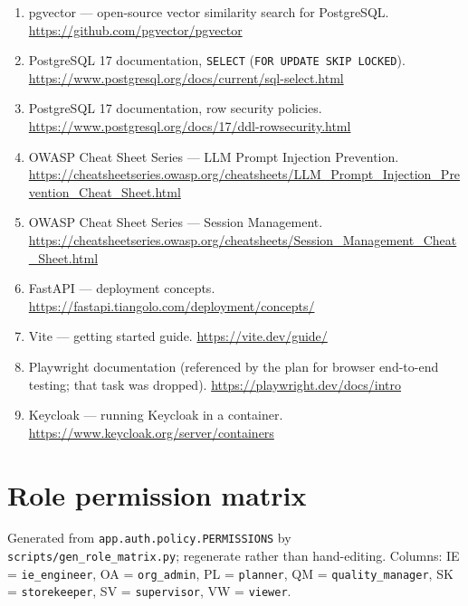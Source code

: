 \documentclass[11pt,a4paper]{article}
\begin{document}
\begin{enumerate}[leftmargin=2em]
\item pgvector --- open-source vector similarity search for PostgreSQL.
  \url{https://github.com/pgvector/pgvector}
\item PostgreSQL 17 documentation, \texttt{SELECT} (\texttt{FOR UPDATE SKIP
  LOCKED}). \url{https://www.postgresql.org/docs/current/sql-select.html}
\item PostgreSQL 17 documentation, row security policies.
  \url{https://www.postgresql.org/docs/17/ddl-rowsecurity.html}
\item OWASP Cheat Sheet Series --- LLM Prompt Injection Prevention.
  \url{https://cheatsheetseries.owasp.org/cheatsheets/LLM_Prompt_Injection_Prevention_Cheat_Sheet.html}
\item OWASP Cheat Sheet Series --- Session Management.
  \url{https://cheatsheetseries.owasp.org/cheatsheets/Session_Management_Cheat_Sheet.html}
\item FastAPI --- deployment concepts.
  \url{https://fastapi.tiangolo.com/deployment/concepts/}
\item Vite --- getting started guide. \url{https://vite.dev/guide/}
\item Playwright documentation (referenced by the plan for browser end-to-end
  testing; that task was dropped). \url{https://playwright.dev/docs/intro}
\item Keycloak --- running Keycloak in a container.
  \url{https://www.keycloak.org/server/containers}
\end{enumerate}

\appendix
\clearpage
\section{Role permission matrix}
\label{app:roles}

Generated from \texttt{app.auth.policy.PERMISSIONS} by
\texttt{scripts/gen\_role\_matrix.py}; regenerate rather than hand-editing.
Columns: IE = \texttt{ie\_engineer}, OA = \texttt{org\_admin}, PL =
\texttt{planner}, QM = \texttt{quality\_manager}, SK = \texttt{storekeeper}, SV =
\texttt{supervisor}, VW = \texttt{viewer}.
\end{document}
